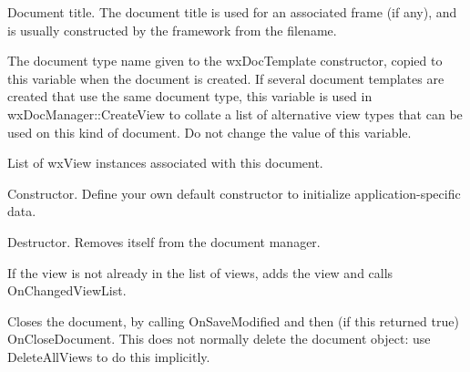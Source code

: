 \label{wxdocumentmdocumenttitle}


Document title. The document title is used for an associated
frame (if any), and is usually constructed by the framework from
the filename.

\label{documenttypename}


The document type name given to the wxDocTemplate constructor, copied to this
variable when the document is created. If several document templates are
created that use the same document type, this variable is used in wxDocManager::CreateView
to collate a list of alternative view types that can be used on this kind of
document. Do not change the value of this variable.

\label{wxdocumentmdocumentviews}


List of wxView instances associated with this document.

\label{wxdocumentctor}


Constructor. Define your own default constructor to initialize application-specific
data.

\label{wxdocumentdtor}


Destructor. Removes itself from the document manager.

\label{wxdocumentaddview}


If the view is not already in the list of views, adds the view and calls OnChangedViewList.

\label{wxdocumentclose}


Closes the document, by calling OnSaveModified and then (if this returned true) OnCloseDocument.
This does not normally delete the document object: use DeleteAllViews to do this implicitly.

\label{wxdocumentdeleteviews}

